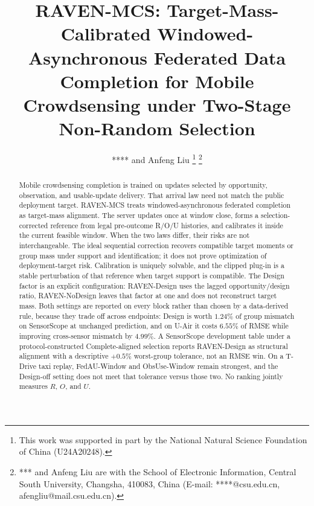 \documentclass[letterpaper,journal]{IEEEtran}
\begin{document}
\title{RAVEN-MCS: Target-Mass-Calibrated Windowed-Asynchronous Federated Data Completion for Mobile Crowdsensing under Two-Stage Non-Random Selection}

\author{**** and Anfeng Liu%
\thanks{This work was supported in part by the National Natural Science Foundation of China (U24A20248).}%
\thanks{*** and Anfeng Liu are with the School of Electronic Information, Central South University, Changsha, 410083, China (E-mail: ****@csu.edu.cn, afengliu@mail.csu.edu.cn).}%
}


\maketitle


\begin{abstract}
Mobile crowdsensing completion is trained on updates selected by
opportunity, observation, and usable-update delivery.  That arrival law
need not match the public deployment target.  RAVEN-MCS treats
windowed-asynchronous federated completion as target-mass alignment.
The server updates once at window close, forms a selection-corrected
reference from legal pre-outcome R/O/U histories, and calibrates it
inside the current feasible window.  When the two laws differ, their
risks are not interchangeable.  The ideal sequential correction recovers
compatible target moments or group mass under support and identification;
it does not prove optimization of deployment-target risk.  Calibration is
uniquely solvable, and the clipped plug-in is a stable perturbation of
that reference when target support is compatible.  The Design factor is an
explicit configuration: RAVEN-Design uses the lagged opportunity/design
ratio, RAVEN-NoDesign leaves that factor at one and does not reconstruct
target mass.  Both settings are reported on every block rather than chosen
by a data-derived rule, because they trade off across endpoints: Design is
worth $1.24\%$ of group mismatch on SensorScope at unchanged prediction, and
on U-Air it costs $6.55\%$ of RMSE while improving cross-sensor mismatch by
$4.99\%$.  A SensorScope development table under
a protocol-constructed Complete-aligned selection reports RAVEN-Design as
structural alignment
with a descriptive $+0.5\%$ worst-group tolerance, not an RMSE win.
On a T-Drive taxi replay,
FedAU-Window and ObsUse-Window remain strongest, and the Design-off setting does
not meet that tolerance versus those two.  No ranking jointly measures
$R$, $O$, and $U$.
\end{abstract}
\end{document}
